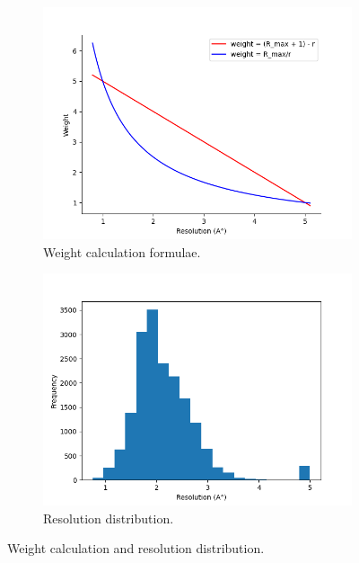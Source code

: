 \documentclass[11pt]{article}
\begin{document}
\begin{figure}
     \centering
     \begin{subfigure}[b]{0.45\textwidth}
         \centering
    \includegraphics[scale=0.5]{images/graphingformula}
    \caption{Weight calculation formulae.}
    \label{fig:graphingformula}
     \end{subfigure}
     \hfill
     \begin{subfigure}[b]{0.45\textwidth}
         \centering
        \includegraphics[scale=0.5]{images/resolutiondistribution}
        \caption{Resolution distribution.}
        \label{fig:resolutiondistribution}
     \end{subfigure}
     \caption{Weight calculation and resolution distribution.}
     \label{fig:ResolutionWeightStats}
\end{figure}
\end{document}
